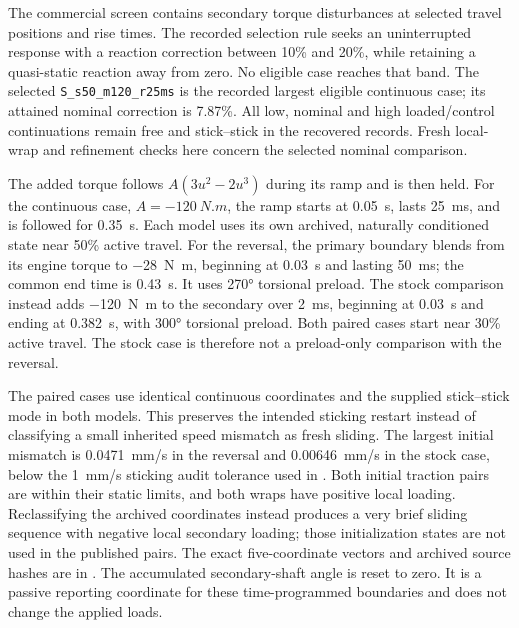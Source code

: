 \documentclass[11pt]{report}
\numberwithin{equation}{section}
\begin{document}
The commercial screen contains secondary torque disturbances at selected
travel positions and rise times. The recorded selection rule seeks an
uninterrupted response with a reaction correction between 10\% and 20\%,
while retaining a quasi-static reaction away from zero. No eligible case
reaches that band. The selected \texttt{S\_s50\_m120\_r25ms} is the
recorded largest eligible continuous case; its attained nominal correction
is \num{7.87}\%. All low, nominal and high loaded/control continuations
remain free and stick--stick in the recovered records. Fresh local-wrap
and refinement checks here concern the selected nominal comparison.

The added torque follows \(A(3u^2-2u^3)\) during its ramp and is then held.
For the continuous case, \(A=\SI{-120}{N.m}\), the ramp starts at
\SI{0.05}{s}, lasts \SI{25}{ms}, and is followed for \SI{0.35}{s}.
Each model uses its own archived, naturally conditioned state near 50\%
active travel. For the reversal, the primary boundary blends from its engine
torque to \SI{-28}{N.m}, beginning at \SI{0.03}{s} and lasting
\SI{50}{ms}; the common end time is \SI{0.43}{s}. It uses \ang{270}
torsional preload. The stock comparison instead adds \SI{-120}{N.m} to
the secondary over \SI{2}{ms}, beginning at \SI{0.03}{s} and ending at
\SI{0.382}{s}, with \ang{300} torsional preload. Both paired cases start
near 30\% active travel. The stock case is therefore not a preload-only
comparison with the reversal.

The paired cases use identical continuous coordinates and the supplied
stick--stick mode in both models. This preserves the intended sticking
restart instead of classifying a small inherited speed mismatch as fresh
sliding. The largest initial mismatch is \SI{0.0471}{mm/s} in the reversal
and \SI{0.00646}{mm/s} in the stock case, below the \SI{1}{mm/s} sticking
audit tolerance used in . Both
initial traction pairs are within their static limits, and both wraps have
positive local loading. Reclassifying the archived coordinates instead
produces a very brief sliding sequence with negative local secondary
loading; those initialization states are not used in the published pairs.
The exact five-coordinate vectors and archived source hashes are in
.
The accumulated secondary-shaft angle is reset to zero. It is a passive
reporting coordinate for these time-programmed boundaries and does not
change the applied loads.
\end{document}
